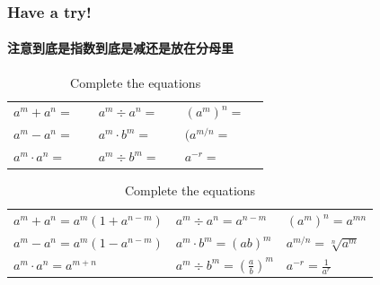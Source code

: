 \documentclass[
	11pt, %
	handout,
]{beamer}
\begin{document}
	\begin{frame}
	\frametitle{Have a try!}
	\framesubtitle{注意到底是指数到底是减还是放在分母里}
	\begin{table}
		\begin{tabular}{l l l}
			\toprule
			$a^m + a^n= \quad $ & $a^m \div a^n = \quad$ & $(a^m)^n = \quad$ \\
      $a^m - a^n= \quad $ & $a^m \cdot b^m = \quad$ & $(a^{m/n} = \quad$ \\
      $a^m \cdot a^n= \quad $ & $a^m \div b^m = \quad$ & $ a^{-r} = \quad$ \\
			\bottomrule
		\end{tabular}
		\caption{Complete the equations}
	\end{table}

	\pause

		\begin{table}
		\begin{tabular}{l l l}
			\toprule
			$a^m + a^n=  a^m(1 + a^{n-m}) $ & $a^m \div a^n = a^{n-m}$ & $(a^m)^n = a^{mn}$ \\
      $a^m - a^n= a^m(1 - a^{n-m}) $ & $a^m \cdot b^m = (ab)^{m}$ & $a^{m/n} = \sqrt[n]{a^m}$ \\
      $a^m \cdot a^n=  a^{m + n}$ & $a^m \div b^m = (\frac{a}{b})^m$ & $ a^{-r} = \frac{1}{a^r}$ \\
			\bottomrule
		\end{tabular}
		\caption{Complete the equations}
	\end{table}

\end{frame}
\end{document}
